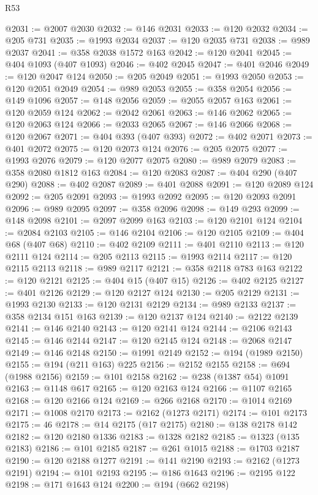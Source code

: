 \begin{lexlean}{R53}
\begin{coremodule}
@2031 := @2007 @2030
@2032 := @146 @2031
@2033 := @120 @2032
@2034 := @205 @731
@2035 := @1993 @2034
@2037 := @120 @2035 @731
@2038 := @989 @2037
@2041 := @358 @2038 @1572 @163
@2042 := @120 @2041
@2045 := @404 @1093 (@407 @1093)
@2046 := @402 @2045
@2047 := @401 @2046
@2049 := @120 @2047 @124
@2050 := @205 @2049
@2051 := @1993 @2050
@2053 := @120 @2051 @2049
@2054 := @989 @2053
@2055 := @358 @2054
@2056 := @149 @1096
@2057 := @148 @2056
@2059 := @2055 @2057 @163
@2061 := @120 @2059 @124
@2062 := @2042 @2061
@2063 := @146 @2062
@2065 := @120 @2063 @124
@2066 := @2033 @2065
@2067 := @146 @2066
@2068 := @120 @2067
@2071 := @404 @393 (@407 @393)
@2072 := @402 @2071
@2073 := @401 @2072
@2075 := @120 @2073 @124
@2076 := @205 @2075
@2077 := @1993 @2076
@2079 := @120 @2077 @2075
@2080 := @989 @2079
@2083 := @358 @2080 @1812 @163
@2084 := @120 @2083
@2087 := @404 @290 (@407 @290)
@2088 := @402 @2087
@2089 := @401 @2088
@2091 := @120 @2089 @124
@2092 := @205 @2091
@2093 := @1993 @2092
@2095 := @120 @2093 @2091
@2096 := @989 @2095
@2097 := @358 @2096
@2098 := @149 @293
@2099 := @148 @2098
@2101 := @2097 @2099 @163
@2103 := @120 @2101 @124
@2104 := @2084 @2103
@2105 := @146 @2104
@2106 := @120 @2105
@2109 := @404 @68 (@407 @68)
@2110 := @402 @2109
@2111 := @401 @2110
@2113 := @120 @2111 @124
@2114 := @205 @2113
@2115 := @1993 @2114
@2117 := @120 @2115 @2113
@2118 := @989 @2117
@2121 := @358 @2118 @783 @163
@2122 := @120 @2121
@2125 := @404 @15 (@407 @15)
@2126 := @402 @2125
@2127 := @401 @2126
@2129 := @120 @2127 @124
@2130 := @205 @2129
@2131 := @1993 @2130
@2133 := @120 @2131 @2129
@2134 := @989 @2133
@2137 := @358 @2134 @151 @163
@2139 := @120 @2137 @124
@2140 := @2122 @2139
@2141 := @146 @2140
@2143 := @120 @2141 @124
@2144 := @2106 @2143
@2145 := @146 @2144
@2147 := @120 @2145 @124
@2148 := @2068 @2147
@2149 := @146 @2148
@2150 := @1991 @2149
@2152 := @194 (@1989 @2150)
@2155 := @194 (@211 @163) @225
@2156 := @2152 @2155
@2158 := @694 (@1988 @2156)
@2159 := @101 @2158
@2162 := @238 (@1387 @54) @1091
@2163 := @1148 @617
@2165 := @120 @2163 @124
@2166 := @1107 @2165
@2168 := @120 @2166 @124
@2169 := @266 @2168
@2170 := @1014 @2169
@2171 := @1008 @2170
@2173 := @2162 (@1273 @2171)
@2174 := @101 @2173
@2175 := 46
@2178 := @14 @2175 (@17 @2175)
@2180 := @138 @2178 @142
@2182 := @120 @2180 @1336
@2183 := @1328 @2182
@2185 := @1323 (@135 @2183)
@2186 := @101 @2185
@2187 := @261 @1015
@2188 := @1703 @2187
@2190 := @120 @2188 @1277
@2191 := @141 @2190
@2193 := @2162 (@1273 @2191)
@2194 := @101 @2193
@2195 := @186 @1643
@2196 := @2195 @122
@2198 := @171 @1643 @124
@2200 := @194 (@662 @2198)

\end{coremodule}
\end{lexlean}
